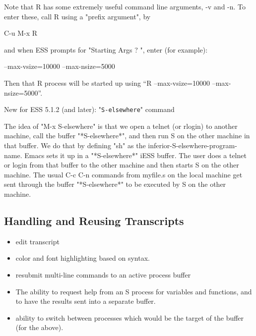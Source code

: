 \documentclass{article}
\begin{document}

Note that R has some extremely useful command line arguments, 
-v and -n.   To enter these, call R using a "prefix argument", by

   C-u M-x R

and when ESS prompts for "Starting Args ? ", enter (for example):

   --max-vsize=10000 --max-nsize=5000

Then that R process will be started up using ``R --max-vsize=10000
--max-nsize=5000''. 



New for ESS 5.1.2 (and later):  "\texttt{S-elsewhere}" command

  The idea of "M-x S-elsewhere" is that we open a telnet (or rlogin)
  to another machine, call the buffer "*S-elsewhere*", and then run S
  on the other machine in that buffer.  We do that by defining "sh" as
  the inferior-S-elsewhere-program-name.  Emacs sets it up in a
  "*S-elsewhere*" iESS buffer.  The user does a telnet or login from
  that buffer to the other machine and then starts S on the other
  machine.  The usual C-c C-n commands from myfile.s on the local
  machine get sent through the buffer "*S-elsewhere*" to be executed
  by S on the other machine.
                           

\subsection{Handling and Reusing Transcripts}
\label{sec:S:trans}

\begin{itemize}
\item  edit transcript 
\item  color and font highlighting based on syntax. 
\item  resubmit multi-line commands to an active process buffer 
\item  The ability to request help from an S process for variables and 
        functions, and to have the results sent into a separate buffer. 
\item  ability to switch between processes which would be the target of the  
  buffer (for the above). 
\end{itemize}
\end{document}
